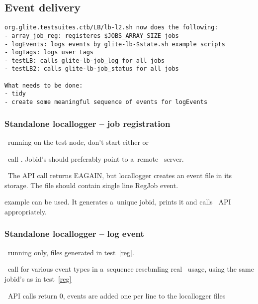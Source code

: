 \subsection{Event delivery}

\begin{verbatim}
org.glite.testsuites.ctb/LB/lb-l2.sh now does the following:
- array_job_reg: registeres $JOBS_ARRAY_SIZE jobs
- logEvents: logs events by glite-lb-$state.sh example scripts
- logTags: logs user tags
- testLB: calls glite-lb-job_log for all jobs
- testLB2: calls glite-lb-job_status for all jobs

What needs to be done:
- tidy
- create some meaningful sequence of events for logEvents
\end{verbatim}



\subsubsection{Standalone locallogger -- job registration}
\label{reg}
\req\ running  on the test node, don't start either
 or 

\how\ call . Jobid's should preferably point
to a~remote \LB\ server.

\result\ The API call returns EAGAIN, but locallogger creates an event file
in its storage.
The file should contain single line RegJob event.

\begin{hints}
 example can be used. It generates a~unique jobid,
prints it and calls \LB\ API appropriately.
\end{hints}

\subsubsection{Standalone locallogger -- log event}
\label{log}
\req\ running  only, files generated in test~\ref{reg}.

\how\ call  for various event types in a~sequence
resebmling real \LB\ usage, using the same jobid's as in test~\ref{reg}

\result\ API calls return 0, events are added one per line to the locallogger files


